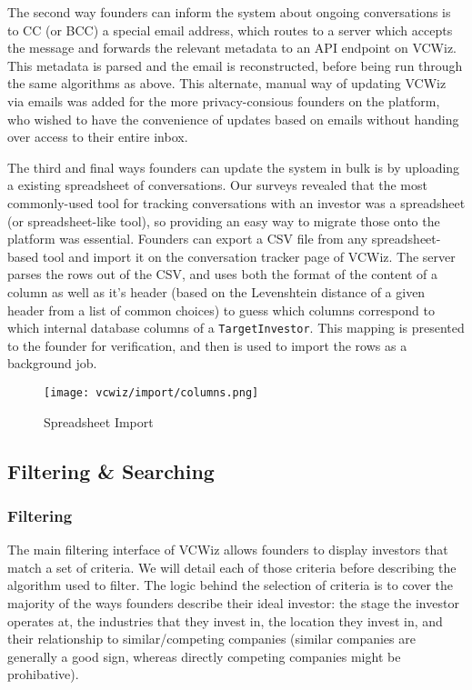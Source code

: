 The second way founders can inform the system about ongoing conversations is to CC (or BCC) a special email address, which routes to a server which accepts the message and forwards the relevant metadata to an API endpoint on VCWiz. This metadata is parsed and the email is reconstructed, before being run through the same algorithms as above. This alternate, manual way of updating VCWiz via emails was added for the more privacy-consious founders on the platform, who wished to have the convenience of updates based on emails without handing over access to their entire inbox.

The third and final ways founders can update the system in bulk is by uploading a existing spreadsheet of conversations. Our surveys revealed that the most commonly-used tool for tracking conversations with an investor was a spreadsheet (or spreadsheet-like tool), so providing an easy way to migrate those onto the platform was essential. Founders can export a CSV file from any spreadsheet-based tool and import it on the conversation tracker page of VCWiz. The server parses the rows out of the CSV, and uses both the format of the content of a column as well as it's header (based on the Levenshtein distance \cite{1966SPhD...10..707L} of a given header from a list of common choices) to guess which columns correspond to which internal database columns of a \texttt{TargetInvestor}. This mapping is presented to the founder for verification, and then is used to import the rows as a background job.

\begin{figure}[ht]
  \texttt{[image: vcwiz/import/columns.png]}
  \centering
  \caption*{Spreadsheet Import}
\end{figure}

\subsection{Filtering \& Searching}

\subsubsection{Filtering}

The main filtering interface of VCWiz allows founders to display investors that match a set of criteria. We will detail each of those criteria before describing the algorithm used to filter. The logic behind the selection of criteria is to cover the majority of the ways founders describe their ideal investor: the stage the investor operates at, the industries that they invest in, the location they invest in, and their relationship to similar/competing companies (similar companies are generally a good sign, whereas directly competing companies might be prohibative).


